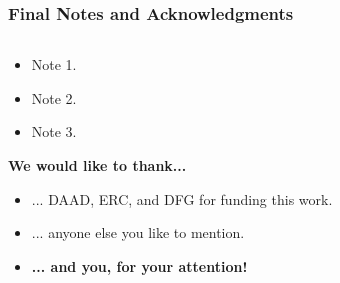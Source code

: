 \documentclass{hyconsys-presentation}
\begin{document}
	\begin{frame} \frametitle{Final Notes and Acknowledgments}	
		\begin{columns}
			\begin{column}{0.65\textwidth}	
				
				\vspace{-0.5em}
				\begin{itemize} 
					\item Note 1.
					\item Note 2. 
					\item Note 3.
				\end{itemize}
				
				\vspace{0.5em}
				\textbf{We would like to thank...}
				\begin{itemize}
					\item ... DAAD, ERC, and DFG for funding this work. 
					\item ... anyone else you like to mention.
					\vspace{1em}
					\item \textbf{... and you, for your attention!}
				\end{itemize}
			\end{column}
		

\end{columns}
\end{frame}
\end{document}
